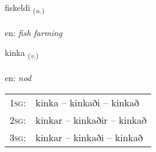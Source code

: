 \documentclass[frontgrid, backgrid]{flacards}\usepackage[]{graphicx}\usepackage[]{xcolor}
\begin{document}
\renewcommand{\flhead}{\vskip5pt \fboxsep=0pt {\small\bfseries\footnotesize Nafnorð | Noun}}
\renewcommand{\fcfoot}{\vskip5pt \fboxsep=0pt \hspace{2pt}{\small\bfseries\footnotesize 3K}}

\renewcommand{\blhead}{\vskip5pt {\small\bfseries\footnotesize Nafnorð | Noun }}
\renewcommand{\bcfoot}{\vskip5pt \hspace{2pt}{\small\bfseries\footnotesize 3K}}


{fiskeldi \small{\textsubscript{(\textit{n.})}} \\[1ex] %
\textphonetic{[fɪskɛltɪ]} \\
en: \emph{fish farming} \\  [2ex]
\renewcommand*{\arraystretch}{0.8}
}

\renewcommand{\flhead}{\vskip5pt \fboxsep=0pt {\small\bfseries\footnotesize Sagnorð | Verb}}
\renewcommand{\fcfoot}{\vskip5pt \fboxsep=0pt \hspace{2pt}{\small\bfseries\footnotesize 3K}}

\renewcommand{\blhead}{\vskip5pt {\small\bfseries\footnotesize Sagnorð | Verb }}
\renewcommand{\bcfoot}{\vskip5pt \hspace{2pt}{\small\bfseries\footnotesize 3K}}


{kinka \small{\textsubscript{(\textit{v.})}} \\[1ex] %
\textphonetic{[cʰiŋ̥ka]} \\
en: \emph{nod} \\  [2ex]
\renewcommand*{\arraystretch}{0.8}
\begin{tabular}{p{1cm}l}
\textsc{1sg}: & kinka -- kinkaði -- kinkað \\ 
\textsc{2sg}: & kinkar -- kinkaðir -- kinkað \\ 
\textsc{3sg}: & kinkar -- kinkaði -- kinkað \\ 
\end{tabular}
}
\end{document}
